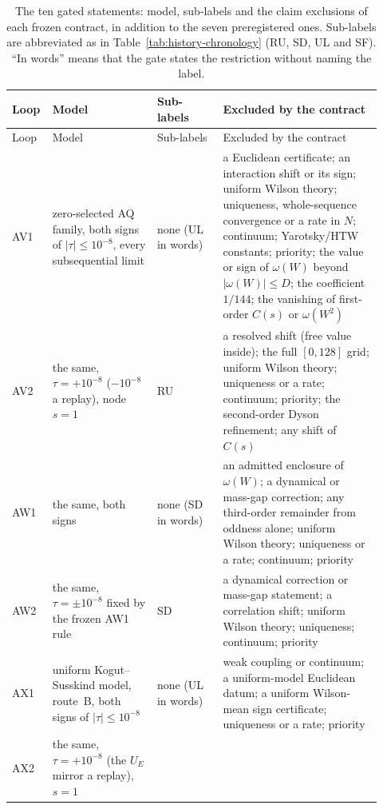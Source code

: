 \begingroup\setlength{\LTcapwidth}{\linewidth}
\begin{longtable}{@{}>{\raggedright\arraybackslash}p{0.07\linewidth}
 >{\raggedright\arraybackslash}p{0.27\linewidth}
 >{\raggedright\arraybackslash}p{0.17\linewidth}
 >{\raggedright\arraybackslash}p{0.41\linewidth}@{}}
\caption{The ten gated statements: model, sub-labels and the claim exclusions
of each frozen contract, in addition to the seven preregistered ones.
Sub-labels are abbreviated as in Table~\ref{tab:history-chronology} (RU,
SD, UL and SF). ``In words'' means that the gate states the restriction
without naming the label.}
\label{tab:limits-gates}\\
\toprule
Loop & Model & Sub-labels & Excluded by the contract\\
\midrule
\endfirsthead
\toprule
Loop & Model & Sub-labels & Excluded by the contract\\
\midrule
\endhead
\bottomrule
\endfoot
AV1 & zero-selected AQ family, both signs of $|\tau|\le10^{-8}$, every
subsequential limit & none (UL in words) & a Euclidean
certificate; an interaction shift or its sign; uniform Wilson theory;
uniqueness, whole-sequence convergence or a rate in $N$; continuum;
Yarotsky/HTW constants; priority; the value or sign of $\omega(W)$ beyond
$|\omega(W)|\le D$; the coefficient $1/144$; the vanishing of first-order
$C(s)$ or $\omega(W^2)$\\\addlinespace
AV2 & the same, $\tau=+10^{-8}$ ($-10^{-8}$ a replay), node $s=1$ &
RU & a resolved shift (free value inside); the full
$[0,128]$ grid; uniform Wilson theory; uniqueness or a rate; continuum;
priority; the second-order Dyson refinement; any shift of $C(s)$\\\addlinespace
AW1 & the same, both signs & none (SD in words) & an admitted enclosure
of $\omega(W)$; a dynamical or mass-gap correction; any third-order remainder
from oddness alone; uniform Wilson theory; uniqueness or a rate; continuum;
priority\\\addlinespace
AW2 & the same, $\tau=\pm10^{-8}$ fixed by the frozen AW1 rule &
SD & a dynamical correction or mass-gap statement; a
correlation shift; uniform Wilson theory; uniqueness; continuum; priority\\\addlinespace
AX1 & uniform Kogut--Susskind model, route~B, both signs of
$|\tau|\le10^{-8}$ & none (UL in words) & weak
coupling or continuum; a uniform-model Euclidean datum; a uniform Wilson-mean
sign certificate; uniqueness or a rate; priority\\\addlinespace
AX2 & the same, $\tau=+10^{-8}$ (the $U_E$ mirror a replay), $s=1$ &

\end{longtable}
